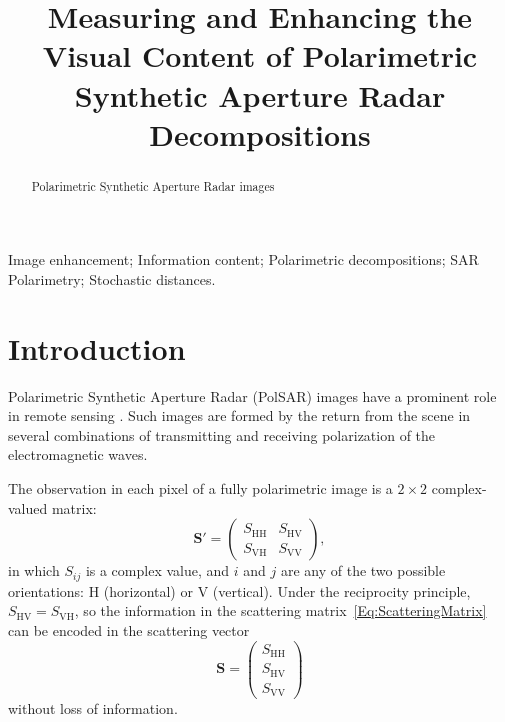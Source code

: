 \documentclass[]{interact}
\theoremstyle{plain}%
\theoremstyle{definition}
\theoremstyle{remark}
\begin{document}
\title{Measuring and Enhancing the Visual Content of Polarimetric Synthetic Aperture Radar Decompositions}
\author{
}

\date{}


\maketitle
\begin{abstract}
Polarimetric Synthetic Aperture Radar images
\end{abstract}

\begin{keywords}
Image enhancement;
Information content;
Polarimetric decompositions;
SAR Polarimetry;
Stochastic distances.
\end{keywords}

\section{Introduction}

Polarimetric Synthetic Aperture Radar (PolSAR) images have a prominent role in remote sensing \citep{PolarisationApplicationsRemoteSensing,LeePottier2009PolarimetricRadarImaging}.
Such images are formed by the return from the scene in several combinations of transmitting and receiving polarization of the electromagnetic waves.

The observation in each pixel of a fully polarimetric image is a $2\times2$ complex-valued matrix:
\begin{equation}
\bm S' = \begin{pmatrix}
	S_{\text{HH}} & S_{\text{HV}}\\
	S_{\text{VH}} & S_{\text{VV}}
\end{pmatrix}, \label{Eq:ScatteringMatrix}
\end{equation}
in which $S_{ij}$ is a complex value, and $i$ and $j$ are any of the two possible orientations: $\text{H}$ (horizontal) or $\text{V}$ (vertical).
Under the reciprocity principle, $S_{\text{HV}}=S_{\text{VH}}$, so the information in the scattering matrix~\eqref{Eq:ScatteringMatrix} can be encoded in the scattering vector
\begin{equation}
\bm S = \begin{pmatrix}
	S_{\text{HH}}\\
	S_{\text{HV}}\\
	S_{\text{VV}}
\end{pmatrix}
\end{equation}
without loss of information.
\end{document}
